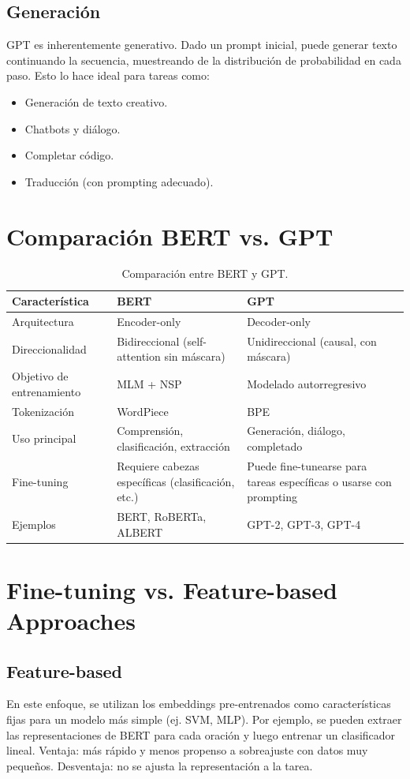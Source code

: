 \documentclass[12pt,a4paper,openany,oneside]{book}
\begin{document}
\subsection{Generación}
GPT es inherentemente generativo. Dado un prompt inicial, puede generar texto continuando la secuencia, muestreando de la distribución de probabilidad en cada paso. Esto lo hace ideal para tareas como:
\begin{itemize}
    \item Generación de texto creativo.
    \item Chatbots y diálogo.
    \item Completar código.
    \item Traducción (con prompting adecuado).
\end{itemize}

\section{Comparación BERT vs. GPT}

\begin{table}[h]
\centering
\begin{tabular}{|l|l|l|}
\hline
\textbf{Característica} & \textbf{BERT} & \textbf{GPT} \\
\hline
Arquitectura & Encoder-only & Decoder-only \\
Direccionalidad & Bidireccional (self-attention sin máscara) & Unidireccional (causal, con máscara) \\
Objetivo de entrenamiento & MLM + NSP & Modelado autorregresivo \\
Tokenización & WordPiece & BPE \\
Uso principal & Comprensión, clasificación, extracción & Generación, diálogo, completado \\
Fine-tuning & Requiere cabezas específicas (clasificación, etc.) & Puede fine-tunearse para tareas específicas o usarse con prompting \\
Ejemplos & BERT, RoBERTa, ALBERT & GPT-2, GPT-3, GPT-4 \\
\hline
\end{tabular}
\caption{Comparación entre BERT y GPT.}
\end{table}

\section{Fine-tuning vs. Feature-based Approaches}

\subsection{Feature-based}
En este enfoque, se utilizan los embeddings pre-entrenados como características fijas para un modelo más simple (ej. SVM, MLP). Por ejemplo, se pueden extraer las representaciones de BERT para cada oración y luego entrenar un clasificador lineal. Ventaja: más rápido y menos propenso a sobreajuste con datos muy pequeños. Desventaja: no se ajusta la representación a la tarea.
\end{document}
